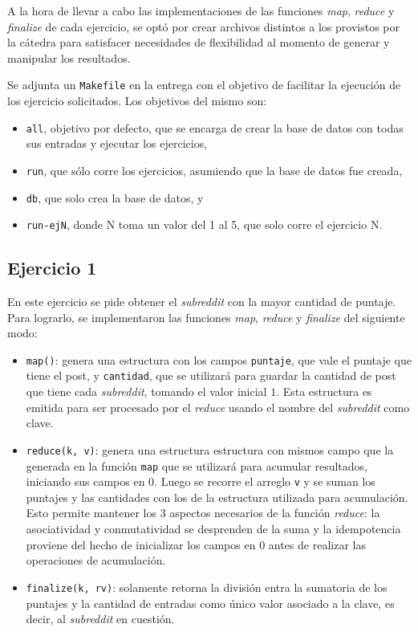 \documentclass[a4paper]{article}
\begin{document}
A la hora de llevar a cabo las implementaciones de las funciones \textit{map},
\textit{reduce} y \textit{finalize} de cada ejercicio, se optó por crear
archivos distintos a los provistos por la cátedra para satisfacer necesidades
de flexibilidad al momento de generar y manipular los resultados.

Se adjunta un \verb|Makefile| en la entrega con el objetivo de facilitar la
ejecución de los ejercicio solicitados. Los objetivos del mismo son:
\begin{itemize}
  \item \verb|all|, objetivo por defecto, que se encarga de crear la base de
  datos con todas sus entradas y ejecutar los ejercicios,
  \item \verb|run|, que sólo corre los ejercicios, asumiendo que la base de
  datos fue creada,
  \item \verb|db|, que solo crea la base de datos, y
  \item \verb|run-ejN|, donde N toma un valor del 1 al 5, que solo corre el
  ejercicio N.
\end{itemize}

\subsection{Ejercicio 1}
En este ejercicio se pide obtener el \textit{subreddit} con la mayor cantidad
de puntaje. Para lograrlo, se implementaron las funciones \textit{map},
\textit{reduce} y \textit{finalize} del siguiente modo:
\begin{itemize}
  \item \verb|map()|: genera una estructura con los campos \verb|puntaje|, que
  vale el puntaje que tiene el post, y \verb|cantidad|, que se utilizará para
  guardar la cantidad de post que tiene cada \textit{subreddit}, tomando el
  valor inicial $1$. Esta estructura es emitida para ser procesado por el
  \textit{reduce} usando el nombre del \textit{subreddit} como clave.
  \item \verb|reduce(k, v)|: genera una estructura estructura con mismos campo
  que la generada en la función \verb|map| que se utilizará para acumular
  resultados, iniciando sus campos en $0$. Luego se recorre el arreglo
  \verb|v| y se suman los puntajes y las cantidades con los de la estructura
  utilizada para acumulación. Esto permite mantener los 3 aspectos necesarios
  de la función \textit{reduce}: la asociatividad y conmutatividad se
  desprenden de la suma y la idempotencia proviene del hecho de inicializar los
  campos en $0$ antes de realizar las operaciones de acumulación.
  \item \verb|finalize(k, rv)|: solamente retorna la división entra la
  sumatoria de los puntajes y la cantidad de entradas como único valor asociado
  a la clave, es decir, al \textit{subreddit} en cuestión.
\end{itemize}
\end{document}
